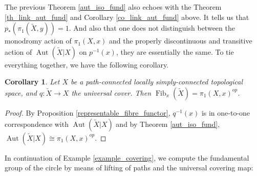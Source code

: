 \documentclass{article}
\theoremstyle{plain}
\newtheorem{corollary}[theorem]{Corollary}
\theoremstyle{definition}
\DeclareMathOperator{\Fib}{Fib}
\DeclareMathOperator{\Aut}{Aut}
\begin{document}
\noindent The previous Theorem \ref{aut_iso_fund} also echoes with the Theorem  \ref{th_link_aut_fund} and Corollary \ref{co_link_aut_fund} above.
It tells us that $p_*(\pi_1(\widetilde{X},y)) = 1$. 
And also that one does not distinguish between the monodromy action of $\pi_1(X,x)$ and the properly discontinuous and transitive action of $\Aut(\widetilde{X} |X)$ on $p^{-1}(x)$, they are essentially the same. 
To tie everything together, we have the following corollary.


\begin{corollary}
\label{fibre_univ_cov}
    Let $X$ be a path-connected locally simply-connected topological space, and $q:\widetilde{X}\rightarrow X$ the universal cover. 
    Then $\Fib_x(\widetilde{X}) = \pi_1(X,x)^{op}$.
\end{corollary}
\begin{proof}
    By Proposition \ref{representable_fibre_functor}, $q^{-1}(x)$ is in one-to-one correspondence with $\Aut(\widetilde{X}|X)$ and by Theorem \ref{aut_iso_fund}, $\Aut(\widetilde{X}|X) \cong \pi_1(X,x)^{op}$.
\end{proof}




\noindent In continuation of Example \ref{example_covering}, we compute the fundamental group of the circle by means of lifting of paths and the universal covering map:
\end{document}
